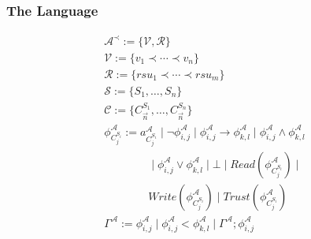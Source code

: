 \documentclass{beamer}
\begin{document}
\begin{frame}
	\label{error3}
	\frametitle{The Language}
	\smallskip

  \begin{definition}\label{def:syntax} %
  	\begin{displaymath}
  	\begin{array}{l}
  	\mathcal{A}^{\prec}:= \{\mathcal{V, R}\}\\
  	\mathcal{V}:= \{v_{1}\prec \cdots \prec v_{n}\}\\
  	\mathcal{R}:= \{rsu_{1}\prec\cdots \prec rsu_{m}\}\\
  	\mathcal{S}:= \{S_1, \dots, S_{n}\}\\  %
  	\mathcal{C}:= \{C^{S_1}_{\overrightarrow{n}},  \dots, C^{S_{n}}_{\overrightarrow{n}}\}\\  %
  	\phi^{\mathcal{A}}_{C^{S_{i}}_{j}}:= a^{\mathcal{A}}_{C^{S_{i}}_{j}}\mid \neg \phi^{\mathcal{A}}_{i,j}\mid \phi^{\mathcal{A}}_{i,j}\rightarrow \phi^{\mathcal{A}}_{k,l}\mid \phi^{\mathcal{A}}_{i,j}\wedge \phi^{\mathcal{A}}_{k,l}\\
  	\qquad \qquad \mid \phi^{\mathcal{A}}_{i,j}\vee \phi^{\mathcal{A}}_{k,l} \mid \bot \mid Read(\phi^{\mathcal{A}}_{C^{S_{i}}_{j}})\mid\\
  	\qquad \qquad Write(\phi^{\mathcal{A}}_{C^{S_{i}}_{j}})\mid Trust(\phi^{\mathcal{A}}_{C^{S_{i}}_{j}})\\
  	\Gamma^{\mathcal{A}}:=
  	\phi^{\mathcal{A}}_{i,j} \mid \phi^{\mathcal{A}}_{i,j} < \phi^{\mathcal{A}}_{k,l} \mid \Gamma^{\mathcal{A}}; \phi^{\mathcal{A}}_{i,j}

  	\end{array}
  	\end{displaymath}
  \end{definition}
\end{frame}
\end{document}
